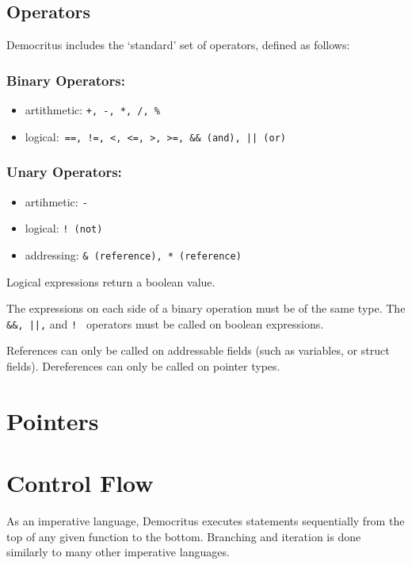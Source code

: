 	\iffalse
	\subsection{Modifiers}
		Information about atomic and pointers here.
	\fi

 	\subsection{Operators}
		
		Democritus includes the `standard' set of operators, defined as follows:

		\subsubsection{Binary Operators:}
		\begin{itemize}
			\item artithmetic: \texttt{+, -, *, /, \%}
			\item logical:\verb^ ==, !=, <, <=, >, >=, && (and), || (or) ^ 
		\end{itemize}

		\subsubsection{Unary Operators:}
		\begin{itemize}
			\item artihmetic: \texttt{-}
			\item logical: \texttt{! (not)}
			\item addressing: \texttt{\& (reference), * (reference)}
		\end{itemize}

		\noindent
		Logical expressions return a boolean value.

		\medskip \noindent
		The expressions on each side of a binary operation must be of the same type. The \verb^ &&, ||,^ and \verb^! ^ operators must be called on boolean expressions.

		\medskip \noindent
		References can only be called on addressable fields (such as variables, or struct fields). Dereferences can only be called on pointer types.

\section{Pointers}

\section{Control Flow}
	As an imperative language, Democritus executes statements sequentially from the top of any given function to the bottom. Branching and iteration is done similarly to many other imperative languages.

